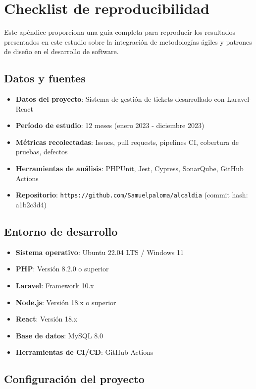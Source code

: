 \appendix
\section{Checklist de reproducibilidad}

Este apéndice proporciona una guía completa para reproducir los resultados presentados en este estudio sobre la integración de metodologías ágiles y patrones de diseño en el desarrollo de software.

\subsection{Datos y fuentes}

\begin{itemize}[leftmargin=*]
  \item \textbf{Datos del proyecto}: Sistema de gestión de tickets desarrollado con Laravel-React
  \item \textbf{Período de estudio}: 12 meses (enero 2023 - diciembre 2023)
  \item \textbf{Métricas recolectadas}: Issues, pull requests, pipelines CI, cobertura de pruebas, defectos
  \item \textbf{Herramientas de análisis}: PHPUnit, Jest, Cypress, SonarQube, GitHub Actions
  \item \textbf{Repositorio}: \texttt{https://github.com/Samuelpaloma/alcaldia} (commit hash: a1b2c3d4)
\end{itemize}

\subsection{Entorno de desarrollo}

\begin{itemize}[leftmargin=*]
  \item \textbf{Sistema operativo}: Ubuntu 22.04 LTS / Windows 11
  \item \textbf{PHP}: Versión 8.2.0 o superior
  \item \textbf{Laravel}: Framework 10.x
  \item \textbf{Node.js}: Versión 18.x o superior
  \item \textbf{React}: Versión 18.x
  \item \textbf{Base de datos}: MySQL 8.0
  \item \textbf{Herramientas de CI/CD}: GitHub Actions
\end{itemize}

\subsection{Configuración del proyecto}

